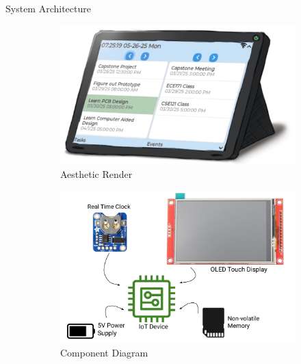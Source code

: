 \documentclass[final]{beamer}
\newlength{\colwidth}
\begin{document}
\begin{frame}[t]
\begin{columns}[t]
\begin{column}{\colwidth}
      \begin{block}{System Architecture}

        \begin{figure}
          \begin{subfigure}[t]{0.6\textwidth}
              \includegraphics[width =\textwidth]{aestheticRender.png}
              \caption{Aesthetic Render}
          \end{subfigure}
          \begin{subfigure}[t]{0.54\textwidth}
              \includegraphics[width =\textwidth]{product_components.pdf}
              \caption{Component Diagram}
          \end{subfigure}
          \begin{subfigure}[t]{0.44\textwidth}

\end{subfigure}
\end{figure}
\end{block}
\end{column}
\end{columns}
\end{frame}
\end{document}
